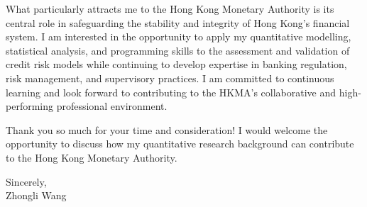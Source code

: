 \documentclass[11pt]{article}
\begin{document}
What particularly attracts me to the Hong Kong Monetary Authority is its central role in safeguarding the stability and integrity of Hong Kong's financial system. I am interested in the opportunity to apply my quantitative modelling, statistical analysis, and programming skills to the assessment and validation of credit risk models while continuing to develop expertise in banking regulation, risk management, and supervisory practices. I am committed to continuous learning and look forward to contributing to the HKMA's collaborative and high-performing professional environment.

Thank you so much for your time and consideration! I would welcome the opportunity to discuss how my quantitative research background can contribute to the Hong Kong Monetary Authority.

\vspace{0.15cm}
\noindent Sincerely, \\[0.2cm]
\noindent Zhongli Wang
\end{document}

